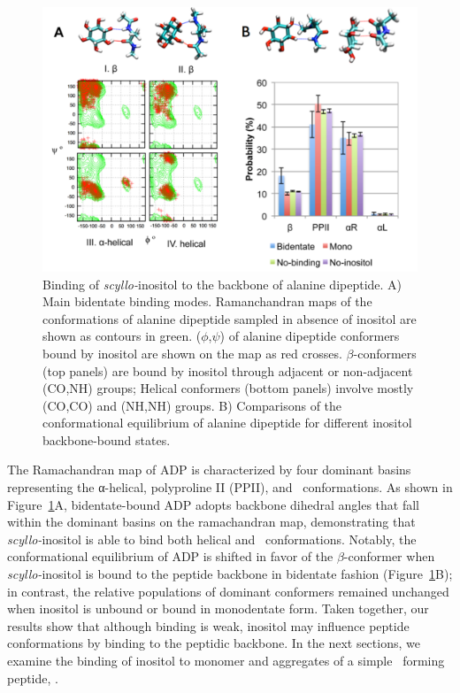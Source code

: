 \begin{figure}[htbp]
    \centering
    \includegraphics[width=6in]{figures/results1/GA4_paper_figures_submitted-2-rearranged}
    \caption[Binding of \textit{scyllo-}inositol to the backbone of alanine dipeptide.]
     {Binding of \textit{scyllo-}inositol to the backbone of alanine dipeptide. A) Main bidentate binding modes. Ramanchandran maps of the conformations of alanine dipeptide sampled in absence of inositol are shown as contours in green. ($\phi$,$\psi$) of alanine dipeptide conformers bound by inositol are shown on the map as red crosses. $\beta$-conformers (top panels) are bound by inositol through adjacent or non-adjacent (CO,NH) groups; Helical conformers (bottom panels) involve mostly (CO,CO) and (NH,NH) groups. B) Comparisons of the conformational equilibrium of alanine dipeptide for different inositol backbone-bound states.}
     \label{fig:figure2}
  \end{figure}
  
The Ramachandran map of ADP is characterized by four dominant basins representing the α-helical, polyproline II (PPII), and \bsheet\ conformations.\cite{Neale:2008p87} As shown in Figure~\ref{fig:figure2}A, bidentate-bound ADP adopts backbone dihedral angles that fall within the dominant basins on the ramachandran map, demonstrating that \textit{scyllo-}inositol is able to bind both helical and \bsheet\ conformations. Notably, the conformational equilibrium of ADP is shifted in favor of the $\beta$-conformer when \textit{scyllo-}inositol is bound to the peptide backbone in bidentate fashion (Figure~\ref{fig:figure2}B); in contrast, the relative populations of dominant conformers remained unchanged when inositol is unbound or bound in monodentate form. Taken together, our results show that although binding is weak, inositol may influence peptide conformations by binding to the peptidic backbone. In the next sections, we examine the binding of inositol to monomer and aggregates of a simple \bsheet\ forming peptide, \gafour.

